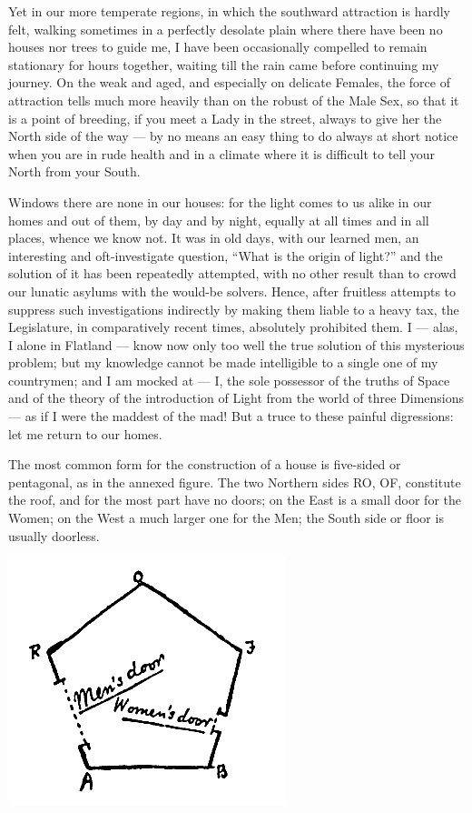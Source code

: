 \documentclass[10pt, kindle, oneside]{kindle}
\begin{document}
Yet in our more temperate regions, in which the southward attraction is hardly
felt, walking sometimes in a perfectly desolate plain where there have been no
houses nor trees to guide me, I have been occasionally compelled to remain
stationary for hours together, waiting till the rain came before continuing my
journey. On the weak and aged, and especially on delicate Females, the force
of attraction tells much more heavily than on the robust of the Male Sex, so
that it is a point of breeding, if you meet a Lady in the street, always to
give her the North side of the way --- by no means an easy thing to do always at
short notice when you are in rude health and in a climate where it is
difficult to tell your North from your South.

Windows there are none in our houses: for the light comes to us alike in our
homes and out of them, by day and by night, equally at all times and in all
places, whence we know not. It was in old days, with our learned men, an
interesting and oft-investigate question, ``What is the origin of light?'' and
the solution of it has been repeatedly attempted, with no other result than to
crowd our lunatic asylums with the would-be solvers. Hence, after fruitless
attempts to suppress such investigations indirectly by making them liable to a
heavy tax, the Legislature, in comparatively recent times, absolutely
prohibited them. I --- alas, I alone in Flatland --- know now only too well the
true solution of this mysterious problem; but my knowledge cannot be made
intelligible to a single one of my countrymen; and I am mocked at --- I, the
sole possessor of the truths of Space and of the theory of the introduction of
Light from the world of three Dimensions --- as if I were the maddest of the
mad! But a truce to these painful digressions: let me return to our homes.

The most common form for the construction of a house is five-sided or
pentagonal, as in the annexed figure. The two Northern sides RO, OF,
constitute the roof, and for the most part have no doors; on the East is a
small door for the Women; on the West a much larger one for the Men; the South
side or floor is usually doorless.
\begin{center}
    \includegraphics[trim=0mm 0mm 0mm 0mm, scale=0.5]{fig2}
\end{center}
\end{document}
